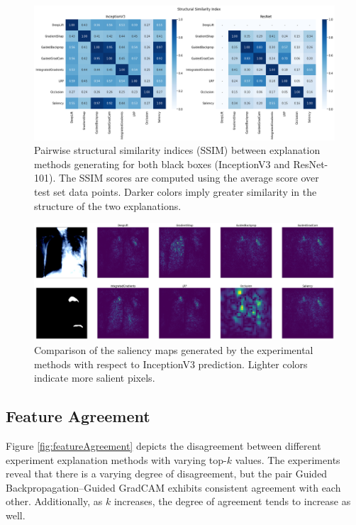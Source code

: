 \begin{figure}[t]
    \centering
    \includegraphics[width=\textwidth]{images/results/ssim.png}
    \caption{Pairwise structural similarity indices (SSIM) between explanation methods generating for both black boxes (InceptionV3 and ResNet-101). The SSIM scores are computed using the average score over test set data points. Darker colors imply greater similarity in the structure of the two explanations.}
    \label{fig:ssim}
\end{figure}

\begin{figure}[t]
    \centering
    \includegraphics[width=\textwidth]{images/results/shape-comparison-inceptionv3.png}
    \caption{Comparison of the saliency maps generated by the experimental methods with respect to InceptionV3 prediction. Lighter colors indicate more salient pixels.}
    \label{fig:shapeComparison}
\end{figure}

\subsection{Feature Agreement}
\label{subsec:featureAgreement}
Figure \ref{fig:featureAgreement} depicts the disagreement between different experiment explanation methods with varying top-$k$ values. The experiments reveal that there is a varying degree of disagreement, but the pair Guided Backpropagation--Guided GradCAM exhibits consistent agreement with each other. Additionally, as $k$ increases, the degree of agreement tends to increase as well.

